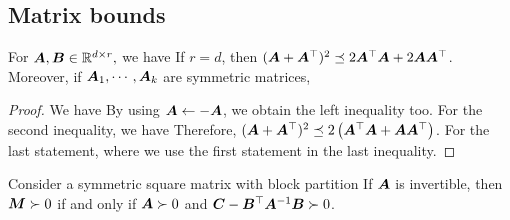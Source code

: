 \subsection{Matrix bounds}
\begin{proposition}
\label{prop:matrixyounginequality}
For $\boldsymbol{A}, \boldsymbol{B} \in \mathbb{R}^{d \times r},$ we have
If $r = d$, then $(\boldsymbol{A} + \boldsymbol{A}^\top)^2 \preceq 2 \boldsymbol{A}^\top \boldsymbol{A} + 2 \boldsymbol{A} \boldsymbol{A}^\top$.   Moreover, if $\boldsymbol{A}_1, \cdots, \boldsymbol{A}_k$ are symmetric matrices,
\end{proposition}

\begin{proof}
We have
By using $\boldsymbol{A} \leftarrow - \boldsymbol{A}$, we obtain the left inequality too. For the second inequality, we have
Therefore,  $(\boldsymbol{A} + \boldsymbol{A}^\top)^2  \preceq  2 \left(  \boldsymbol{A}^\top \boldsymbol{A} + \boldsymbol{A} \boldsymbol{A}^\top \right)$.  For the last statement,
where we use the first statement in the last inequality.
\end{proof}


\begin{proposition}
\label{prop:blockmatrixposdef}
Consider a symmetric square matrix with block partition
If $\boldsymbol{A}$ is invertible,  then  $\boldsymbol{M} \succ 0$ if and only if $\boldsymbol{A} \succ 0$ and $\boldsymbol{C} - \boldsymbol{B}^\top \boldsymbol{A}^{-1} \boldsymbol{B} \succ 0$.
\end{proposition}

